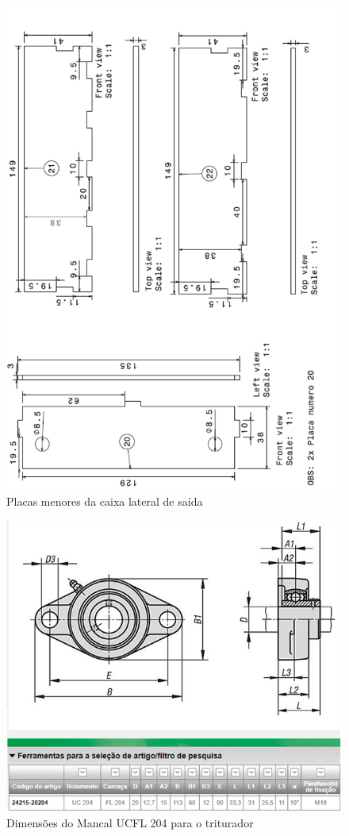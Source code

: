\begin{anexosenv}
\begin{figure}[!ht]
	\centering
		\includegraphics[scale=0.6]{figuras/estrutura/anexos/9.png}
	\caption{Placas menores da caixa lateral de saída}
\end{figure}

\begin{figure}[!ht]
	\centering
		\includegraphics[scale=0.6]{figuras/estrutura/anexos/10.png}
	\caption{Dimensões do Mancal UCFL 204 para o triturador}
\end{figure}


\end{anexosenv}
